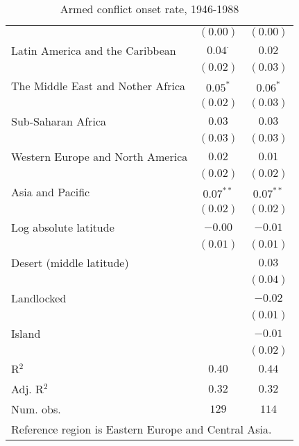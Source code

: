 \begin{table}[H]
\begin{center}
{\begin{tabular}{l c c}
                                  & $(0.00)$       & $(0.00)$       \\
Latin America and the Caribbean   & $0.04^{\cdot}$ & $0.02$         \\
                                  & $(0.02)$       & $(0.03)$       \\
The Middle East and Nother Africa & $0.05^{*}$     & $0.06^{*}$     \\
                                  & $(0.02)$       & $(0.03)$       \\
Sub-Saharan Africa                & $0.03$         & $0.03$         \\
                                  & $(0.03)$       & $(0.03)$       \\
Western Europe and North America  & $0.02$         & $0.01$         \\
                                  & $(0.02)$       & $(0.02)$       \\
Asia and Pacific                  & $0.07^{**}$    & $0.07^{**}$    \\
                                  & $(0.02)$       & $(0.02)$       \\
Log absolute latitude             & $-0.00$        & $-0.01$        \\
                                  & $(0.01)$       & $(0.01)$       \\
Desert (middle latitude)          &                & $0.03$         \\
                                  &                & $(0.04)$       \\
Landlocked                        &                & $-0.02$        \\
                                  &                & $(0.01)$       \\
Island                            &                & $-0.01$        \\
                                  &                & $(0.02)$       \\
\hline
R$^2$                             & $0.40$         & $0.44$         \\
Adj. R$^2$                        & $0.32$         & $0.32$         \\
Num. obs.                         & $129$          & $114$          \\
\hline
\multicolumn{3}{l}{\scriptsize{Reference region is Eastern Europe and Central Asia.}}
\end{tabular}
}
\caption{Armed conflict onset rate, 1946-1988}
\label{onset46-88}
\end{center}
\end{table}
